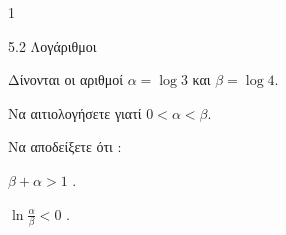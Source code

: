 \begin{ylh}{1}
\item 5.2 Λογάριθμοι
\end{ylh}
Δίνονται οι αριθμοί $\alpha = \log 3$ και $\beta = \log 4$.
\begin{alist}
\item Να αιτιολογήσετε γιατί $0 < \alpha < \beta$.
\item Να αποδείξετε ότι :
\begin{rlist}
\item $\beta + \alpha > 1$ .
\item $\ln\frac{\alpha}{\beta} < 0$ .
\end{rlist}
\end{alist}

